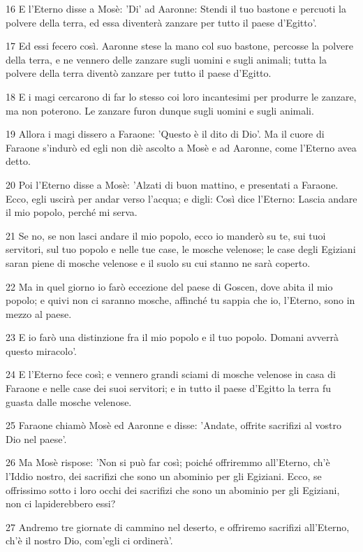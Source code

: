 \par 16 E l'Eterno disse a Mosè: 'Di' ad Aaronne: Stendi il tuo bastone e percuoti la polvere della terra, ed essa diventerà zanzare per tutto il paese d'Egitto'.
\par 17 Ed essi fecero così. Aaronne stese la mano col suo bastone, percosse la polvere della terra, e ne vennero delle zanzare sugli uomini e sugli animali; tutta la polvere della terra diventò zanzare per tutto il paese d'Egitto.
\par 18 E i magi cercarono di far lo stesso coi loro incantesimi per produrre le zanzare, ma non poterono. Le zanzare furon dunque sugli uomini e sugli animali.
\par 19 Allora i magi dissero a Faraone: 'Questo è il dito di Dio'. Ma il cuore di Faraone s'indurò ed egli non diè ascolto a Mosè e ad Aaronne, come l'Eterno avea detto.
\par 20 Poi l'Eterno disse a Mosè: 'Alzati di buon mattino, e presentati a Faraone. Ecco, egli uscirà per andar verso l'acqua; e digli: Così dice l'Eterno: Lascia andare il mio popolo, perché mi serva.
\par 21 Se no, se non lasci andare il mio popolo, ecco io manderò su te, sui tuoi servitori, sul tuo popolo e nelle tue case, le mosche velenose; le case degli Egiziani saran piene di mosche velenose e il suolo su cui stanno ne sarà coperto.
\par 22 Ma in quel giorno io farò eccezione del paese di Goscen, dove abita il mio popolo; e quivi non ci saranno mosche, affinché tu sappia che io, l'Eterno, sono in mezzo al paese.
\par 23 E io farò una distinzione fra il mio popolo e il tuo popolo. Domani avverrà questo miracolo'.
\par 24 E l'Eterno fece così; e vennero grandi sciami di mosche velenose in casa di Faraone e nelle case dei suoi servitori; e in tutto il paese d'Egitto la terra fu guasta dalle mosche velenose.
\par 25 Faraone chiamò Mosè ed Aaronne e disse: 'Andate, offrite sacrifizi al vostro Dio nel paese'.
\par 26 Ma Mosè rispose: 'Non si può far così; poiché offriremmo all'Eterno, ch'è l'Iddio nostro, dei sacrifizi che sono un abominio per gli Egiziani. Ecco, se offrissimo sotto i loro occhi dei sacrifizi che sono un abominio per gli Egiziani, non ci lapiderebbero essi?
\par 27 Andremo tre giornate di cammino nel deserto, e offriremo sacrifizi all'Eterno, ch'è il nostro Dio, com'egli ci ordinerà'.
